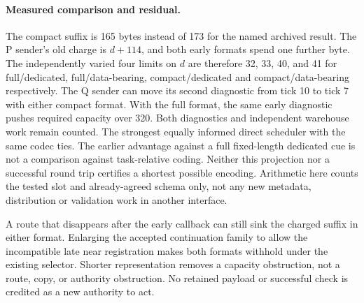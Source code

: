 \documentclass{article}
\begin{document}
\paragraph{Measured comparison and residual.}
The compact suffix is 165 bytes instead of 173 for the named archived
result. The P sender's old charge is $d+114$, and both early formats
spend one further byte. The independently varied four limits on $d$
are therefore 32, 33, 40, and 41 for full/dedicated, full/data-bearing,
compact/dedicated and compact/data-bearing respectively. The Q sender
can move its second diagnostic from tick 10 to tick 7 with either
compact format. With the full format, the same early diagnostic pushes
required capacity over 320. Both diagnostics and independent warehouse
work remain counted. The strongest equally informed direct scheduler
with the same codec ties. The earlier advantage against a full
fixed-length dedicated cue is not a comparison against task-relative
coding. Neither this projection nor a successful round trip certifies a
shortest possible encoding. Arithmetic here counts the tested slot and
already-agreed schema only, not any new metadata, distribution or
validation work in another interface.

A route that disappears after the early callback can still sink the
charged suffix in either format. Enlarging the accepted continuation
family to allow the incompatible late near registration makes both
formats withhold under the existing selector. Shorter representation
removes a capacity obstruction, not a route, copy, or authority
obstruction. No retained payload or successful check is credited as a
new authority to act.
\end{document}
